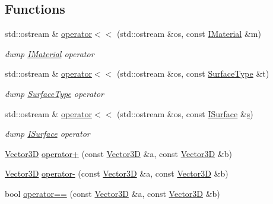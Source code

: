 \subsection*{Functions}
\begin{DoxyCompactItemize}
\item 
std::ostream \& \hyperlink{namespace_d_d_surfaces_a35c78a02d17fc318ec3712554a0da234}{operator$<$$<$} (std::ostream \&os, const \hyperlink{class_d_d_surfaces_1_1_i_material}{IMaterial} \&m)
\begin{DoxyCompactList}\small\item\em dump \hyperlink{class_d_d_surfaces_1_1_i_material}{IMaterial} operator \item\end{DoxyCompactList}\item 
std::ostream \& \hyperlink{namespace_d_d_surfaces_abb03d1e9cbbd691e8e30c541e5f9df8a}{operator$<$$<$} (std::ostream \&os, const \hyperlink{class_d_d_surfaces_1_1_surface_type}{SurfaceType} \&t)
\begin{DoxyCompactList}\small\item\em dump \hyperlink{class_d_d_surfaces_1_1_surface_type}{SurfaceType} operator \item\end{DoxyCompactList}\item 
std::ostream \& \hyperlink{namespace_d_d_surfaces_a13440819dc71cf67cecba8bb55f72726}{operator$<$$<$} (std::ostream \&os, const \hyperlink{class_d_d_surfaces_1_1_i_surface}{ISurface} \&\hyperlink{_volumes_8cpp_a17ca6bfc8040d695d3cada22a4763d40}{s})
\begin{DoxyCompactList}\small\item\em dump \hyperlink{class_d_d_surfaces_1_1_i_surface}{ISurface} operator \item\end{DoxyCompactList}\item 
\hyperlink{class_d_d_surfaces_1_1_vector3_d}{Vector3D} \hyperlink{namespace_d_d_surfaces_a53190f14a4492924eba5f73fe10b7c2e}{operator+} (const \hyperlink{class_d_d_surfaces_1_1_vector3_d}{Vector3D} \&a, const \hyperlink{class_d_d_surfaces_1_1_vector3_d}{Vector3D} \&b)
\item 
\hyperlink{class_d_d_surfaces_1_1_vector3_d}{Vector3D} \hyperlink{namespace_d_d_surfaces_a99285e6f4b3e9bbe41a5ce357ed5f4ce}{operator-\/} (const \hyperlink{class_d_d_surfaces_1_1_vector3_d}{Vector3D} \&a, const \hyperlink{class_d_d_surfaces_1_1_vector3_d}{Vector3D} \&b)
\item 
bool \hyperlink{namespace_d_d_surfaces_a2fac63bbe49a2ac54035b3b5100241b4}{operator==} (const \hyperlink{class_d_d_surfaces_1_1_vector3_d}{Vector3D} \&a, const \hyperlink{class_d_d_surfaces_1_1_vector3_d}{Vector3D} \&b)

\end{DoxyCompactItemize}
